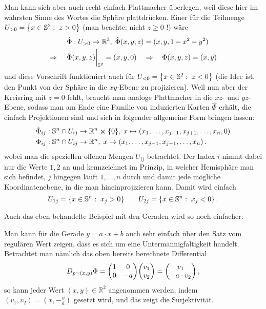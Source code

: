 \documentclass[../H_Analysis_main.tex]{subfiles}
\begin{document}
\begin{bsp}[Sphäre]
Man kann sich aber auch recht einfach Plattmacher überlegen, weil diese hier im wahrsten Sinne des Wortes die Sphäre plattdrücken. Einer für die Teilmenge $U_{> 0} = \qty{x \in \mathbb{S}^2: \; z > 0}$ (man beachte: nicht $z \geq 0$ !) wäre
\begin{equation}
\begin{split}
\hat{\Phi}: U_{> 0} \rightarrow \mathbb{R}^3, \; \hat{\Phi}(x, y, z) &= (x, y, 1 - x^2 - y^2) 
\\
\Rightarrow \quad \eval{\hat{\Phi}(x, y, z)}_{\mathbb{S}^2} = (x, y, 0) \quad &\Rightarrow \quad \Phi(x, y, z) = (x, y)
\end{split}
\end{equation}
und diese Vorschrift funktioniert auch für $U_{< 0} = \qty{x \in \mathbb{S}^2: \; z < 0}$ (die Idee ist, den Punkt von der Sphäre in die $xy$-Ebene zu projizieren). Weil nun aber der Kreisring mit $z = 0$ fehlt, braucht man analoge Plattmacher in die $xz$- und $yz$-Ebene, sodass man am Ende eine Familie von induzierten Karten $\hat{\Phi}$ erhält, die einfach Projektionen sind und sich in folgender allgemeine Form bringen lassen:
\begin{equation}
\begin{split}
\hat{\Phi}_{ij}&: \mathbb{S}^n \cap U_{ij} \rightarrow \mathbb{R}^n \cross \qty{0}, \; x \mapsto (x_1, \dots, x_{j - 1}, x_{j + 1}, \dots, x_n, 0)
\\
\Phi_{ij}&: \mathbb{S}^n \cap U_{ij} \rightarrow \mathbb{R}^n, \; x \mapsto (x_1, \dots, x_{j - 1}, x_{j + 1}, \dots, x_n) \, .
\end{split}
\end{equation}
wobei man die speziellen offenen Mengen $U_{ij}$ betrachtet. Der Index $i$ nimmt dabei nur die Werte $1, 2$ an und kennzeichnet im Prinzip, in welcher Hemisphäre man sich befindet, $j$ hingegen läuft $1, \dots, n$ durch und damit jede mögliche Koordinatenebene, in die man hineinprojizieren kann. Damit wird einfach
\begin{equation}
U_{1j} = \qty{x \in \mathbb{S}^n: \; x_j > 0} \qquad U_{2j} = \qty{x \in \mathbb{S}^n: \; x_j < 0} \, .
\end{equation}
\end{bsp}

Auch das eben behandelte Beispiel mit den Geraden wird so noch einfacher:
\begin{bsp}[Geraden V2]
Man kann für die Gerade $y = a \cdot x + b$ auch sehr einfach über den Satz vom regulären Wert zeigen, dass es sich um eine Untermannigfaltigkeit handelt. Betrachtet man nämlich das oben bereits berechnete Differential
\begin{equation*}
D_{p = (x, y)} \Phi = \mqty(1 & 0 \\ 0 & -a) \mqty(v_1 \\ v_2) = \mqty(v_1 \\ -a \cdot v_2) \, ,
\end{equation*}
so kann jeder Wert $(x, y) \in \mathbb{R}^2$ angenommen werden, indem $(v_1, v_2) = (x, -\frac{y}{a})$ gesetzt wird, und das zeigt die Surjektivität.
\end{bsp}
\end{document}
